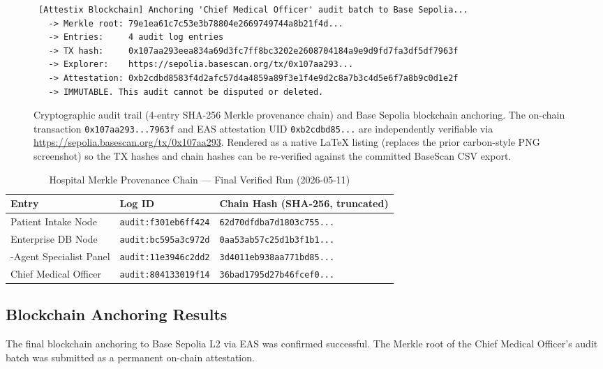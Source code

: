 \begin{figure}[H]
\begin{lstlisting}
 [Attestix Blockchain] Anchoring 'Chief Medical Officer' audit batch to Base Sepolia...
   -> Merkle root: 79e1ea61c7c53e3b78804e2669749744a8b21f4d...
   -> Entries:     4 audit log entries
   -> TX hash:     0x107aa293eea834a69d3fc7ff8bc3202e2608704184a9e9d9fd7fa3df5df7963f
   -> Explorer:    https://sepolia.basescan.org/tx/0x107aa293...
   -> Attestation: 0xb2cdbd8583f4d2afc57d4a4859a89f3e1f4e9d2c8a7b3c4d5e6f7a8b9c0d1e2f
   -> IMMUTABLE. This audit cannot be disputed or deleted.
\end{lstlisting}
\caption{Cryptographic audit trail (4-entry SHA-256 Merkle provenance chain) and Base Sepolia blockchain anchoring. The on-chain transaction \texttt{0x107aa293...7963f} and EAS attestation UID \texttt{0xb2cdbd85...} are independently verifiable via \url{https://sepolia.basescan.org/tx/0x107aa293}. Rendered as a native \LaTeX{} listing (replaces the prior carbon-style PNG screenshot) so the TX hashes and chain hashes can be re-verified against the committed BaseScan CSV export.}
\label{fig:carbon_merkle}
\end{figure}

\begin{table}[H]
\centering
\caption{Hospital Merkle Provenance Chain --- Final Verified Run (2026-05-11)}
\label{tab:merkle_chain}
\renewcommand{\arraystretch}{1.15}\small
\begin{tabularx}{\textwidth}{|>{\raggedright\arraybackslash}p{4.5cm}|l|X|}
\hline
\textbf{Entry} & \textbf{Log ID} & \textbf{Chain Hash (SHA-256, truncated)} \\
\hline
Patient Intake Node & \texttt{audit:f301eb6ff424} & \texttt{62d70dfdba7d1803c755...} \\
\hline
Enterprise DB Node & \texttt{audit:bc595a3c972d} & \texttt{0aa53ab57c25d1b3f1b1...} \\
\hline
6-Agent Specialist Panel & \texttt{audit:11e3946c2dd2} & \texttt{3d4011eb938aa771bd85...} \\
\hline
Chief Medical Officer & \texttt{audit:804133019f14} & \texttt{36bad1795d27b46fcef0...} \\
\hline
\end{tabularx}\normalsize
\end{table}

\subsection{Blockchain Anchoring Results}

The final blockchain anchoring to Base Sepolia L2 via EAS was confirmed successful. The Merkle root of the Chief Medical Officer's audit batch was submitted as a permanent on-chain attestation.

